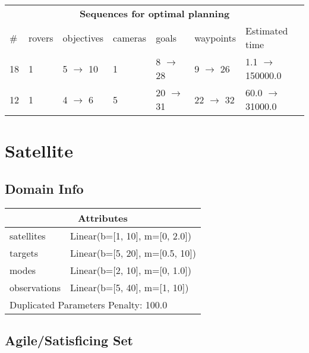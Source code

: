\documentclass{article}
\begin{document}
                            \begin{center}
                            \begin{tabular}{l|l|l|l|l|l|l}
                            \multicolumn{7}{c}{\bf \large Sequences for optimal planning}\\
                            \# & rovers & objectives & cameras & goals & waypoints & Estimated time\\\midrule
                            18&1&5 $\rightarrow$ 10&1&8 $\rightarrow$ 28&9 $\rightarrow$ 26&1.1 $\rightarrow$ 150000.0\\
12&1&4 $\rightarrow$ 6&5&20 $\rightarrow$ 31&22 $\rightarrow$ 32&60.0 $\rightarrow$ 31000.0
                            \end{tabular}
                            \end{center}
                    \newpage \section{Satellite}
                    \subsection*{Domain Info}

                    \begin{center}
                    \begin{tabular}{p{}p{}}
                    \multicolumn{2}{c}{\bf \large Attributes}\\\midrule
                    satellites & Linear(b=[1, 10], m=[0, 2.0])\\
targets & Linear(b=[5, 20], m=[0.5, 10])\\
modes & Linear(b=[2, 10], m=[0, 1.0])\\
observations & Linear(b=[5, 40], m=[1, 10])
                    
                     \\\midrule
                    \multicolumn{2}{l}{Duplicated Parameters Penalty: 100.0}
                    \end{tabular}
                    \end{center}
                
                         \subsection*{Agile/Satisficing Set}
\end{document}
